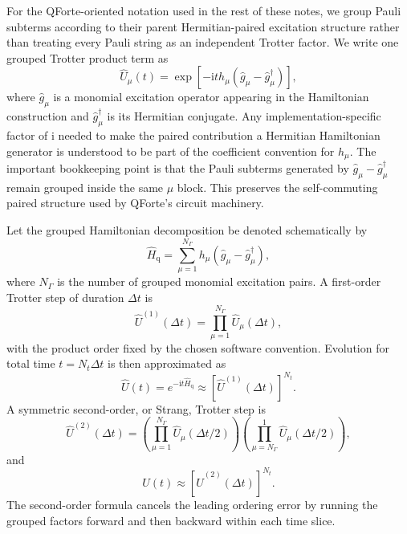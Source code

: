 \documentclass[11pt]{article}
\newcommand{\ii}{\mathrm{i}}
\begin{document}
For the QForte-oriented notation used in the rest of these notes, we group Pauli subterms according to their parent Hermitian-paired excitation structure rather than treating every Pauli string as an independent Trotter factor.  We write one grouped Trotter product term as
\begin{equation}
    \hat{U}_\mu(t)
    = \exp\left[-\ii t h_\mu\left(\hat{g}_\mu-\hat{g}_\mu^\dagger\right)\right],
    \label{eq:grouped_trotter_term}
\end{equation}
where $\hat{g}_\mu$ is a monomial excitation operator appearing in the Hamiltonian construction and $\hat{g}_\mu^\dagger$ is its Hermitian conjugate.  Any implementation-specific factor of $\ii$ needed to make the paired contribution a Hermitian Hamiltonian generator is understood to be part of the coefficient convention for $h_\mu$.  The important bookkeeping point is that the Pauli subterms generated by $\hat{g}_\mu-\hat{g}_\mu^\dagger$ remain grouped inside the same $\mu$ block.  This preserves the self-commuting paired structure used by QForte's circuit machinery.

Let the grouped Hamiltonian decomposition be denoted schematically by
\begin{equation}
    \hat{H}_{\mathrm{q}}
    = \sum_{\mu=1}^{N_\Gamma} h_\mu
    \left(\hat{g}_\mu-\hat{g}_\mu^\dagger\right),
\end{equation}
where $N_\Gamma$ is the number of grouped monomial excitation pairs.  A first-order Trotter step of duration $\Delta t$ is
\begin{equation}
    \hat{U}^{(1)}(\Delta t)
    = \prod_{\mu=1}^{N_\Gamma}\hat{U}_\mu(\Delta t),
    \label{eq:first_order_trotter_step}
\end{equation}
with the product order fixed by the chosen software convention.  Evolution for total time $t=N_t\Delta t$ is then approximated as
\begin{equation}
    \hat{U}(t)
    = e^{-\ii t\hat{H}_{\mathrm{q}}}
    \approx \left[\hat{U}^{(1)}(\Delta t)\right]^{N_t}.
\end{equation}
A symmetric second-order, or Strang, Trotter step is
\begin{equation}
    \hat{U}^{(2)}(\Delta t)
    = \left(\prod_{\mu=1}^{N_\Gamma}\hat{U}_\mu(\Delta t/2)\right)
      \left(\prod_{\mu=N_\Gamma}^{1}\hat{U}_\mu(\Delta t/2)\right),
    \label{eq:second_order_trotter_step}
\end{equation}
and
\begin{equation}
    \hat{U}(t)\approx \left[\hat{U}^{(2)}(\Delta t)\right]^{N_t}.
\end{equation}
The second-order formula cancels the leading ordering error by running the grouped factors forward and then backward within each time slice.
\end{document}
